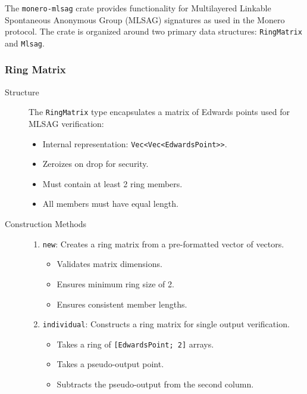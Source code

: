 The \texttt{monero-mlsag} crate provides functionality for Multilayered Linkable Spontaneous Anonymous Group (MLSAG) signatures as used in the Monero protocol.  
The crate is organized around two primary data structures: \texttt{RingMatrix} and \texttt{Mlsag}.

\subsubsection{Ring Matrix}

\begin{description}
\item[Structure] \hfill 

The \texttt{RingMatrix} type encapsulates a matrix of Edwards points used for MLSAG verification:  
\begin{itemize}
\item Internal representation: \texttt{Vec<Vec<EdwardsPoint>>}.  
\item Zeroizes on drop for security.  
\item Must contain at least 2 ring members.  
\item All members must have equal length.  
\end{itemize}

\item[Construction Methods] \hfill 
\begin{enumerate}
\item \texttt{new}: Creates a ring matrix from a pre-formatted vector of vectors.  
  \begin{itemize}
  \item Validates matrix dimensions.  
  \item Ensures minimum ring size of 2.  
  \item Ensures consistent member lengths.  
  \end{itemize}

\item \texttt{individual}: Constructs a ring matrix for single output verification.  
  \begin{itemize}
  \item Takes a ring of \texttt{[EdwardsPoint; 2]} arrays.  
  \item Takes a pseudo-output point.  
  \item Subtracts the pseudo-output from the second column.  
  \end{itemize}
\end{enumerate}


\end{description}
